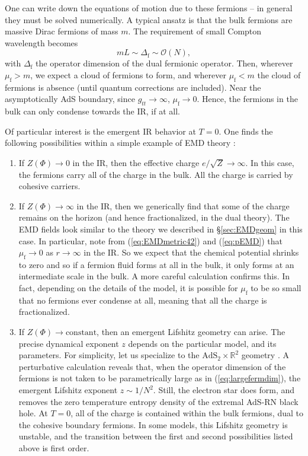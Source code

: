 \documentclass[10pt, oneside]{book}
\begin{document}
\begin{doublespace}
One can write down the equations of motion due to these fermions -- in general they must be solved numerically.   A typical ansatz is that the bulk fermions are massive Dirac fermions of mass $m$.  The requirement of small Compton wavelength becomes \begin{equation}
mL \sim \Delta_{\mathrm{f}} \sim \mathcal{O}(N),   \label{eq:largefermdim}
\end{equation}
with $\Delta_{\mathrm{f}}$ the operator dimension of the dual fermionic operator.   Then,  wherever $\mu_{\mathrm{f}} > m$, we expect a cloud of fermions to form, and wherever $\mu_{\mathrm{f}} < m$ the cloud of fermions is absence (until quantum corrections are included).   Near the asymptotically AdS boundary, since $g_{tt} \rightarrow \infty$, $\mu_{\mathrm{f}}\rightarrow 0$.  Hence, the fermions in the bulk can only condense towards the IR, if at all.   

Of particular interest is the emergent IR behavior at $T=0$.   One finds the following possibilities within a simple example of EMD theory \cite{Hartnoll:2011pp}: \begin{enumerate}
\item  If $Z(\Phi) \rightarrow 0$ in the IR,  then the effective charge $e/\sqrt{Z} \rightarrow \infty$.  In this case, the fermions carry all of the charge in the bulk.   All the charge is carried by cohesive carriers.
\item If $Z(\Phi) \rightarrow \infty$ in the IR, then we generically find that some of the charge remains on the horizon (and hence fractionalized, in the dual theory).   The EMD fields look similar to the theory we described in \S\ref{sec:EMDgeom} in this case.  In particular,  note from (\ref{eq:EMDmetric42}) and (\ref{eq:pEMD}) that $\mu_{\mathrm{f}} \rightarrow 0$ as $r\rightarrow \infty$ in the IR.  So we expect that the chemical potential shrinks to zero and so if a fermion fluid forms at all in the bulk,  it only forms at an intermediate scale in the bulk.   A more careful calculation confirms this.  In fact, depending on the details of the model, it is possible for $\mu_{\mathrm{f}}$ to be so small that no fermions ever condense at all, meaning that all the charge is fractionalized.
\item If $Z(\Phi) \rightarrow \text{constant}$, then an emergent Lifshitz geometry can arise.  The precise dynamical exponent $z$ depends on the particular model, and its parameters.  For simplicity, let us specialize to the $\mathrm{AdS}_2 \times \mathbb{R}^2$ geometry \cite{Hartnoll:2009ns}.   A perturbative calculation reveals that, when the operator dimension of the fermions is not taken to be parametrically large as in (\ref{eq:largefermdim}), the emergent Lifshitz exponent $z\sim 1/N^2$.   Still, the electron star does form,  and removes the zero temperature entropy density of the extremal AdS-RN black hole.  At $T=0$, all of the charge is contained within the bulk fermions, dual to the cohesive boundary fermions.    
In some models, this Lifshitz geometry is unstable, and the transition between the first and second possibilities listed above is first order.
\end{enumerate}


\end{doublespace}
\end{document}
